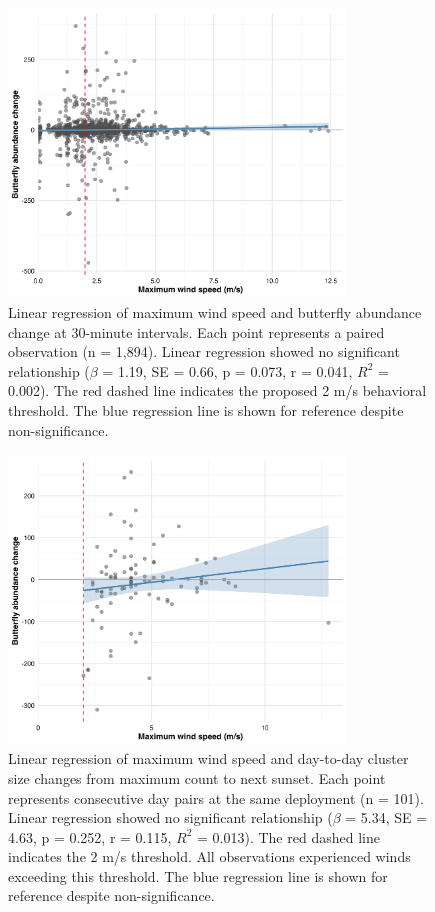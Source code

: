 \begin{figure}[htbp]
    \centering
    \includegraphics[width=0.8\textwidth]{supplemental/results/30_min/figures/wind_vs_change_bivariate_untransformed.png}
    \caption{Linear regression of maximum wind speed and butterfly abundance change at 30-minute intervals. Each point represents a paired observation (n = 1,894). Linear regression showed no significant relationship ($\beta$ = 1.19, SE = 0.66, p = 0.073, r = 0.041, $R^2$ = 0.002). The red dashed line indicates the proposed 2 m/s behavioral threshold. The blue regression line is shown for reference despite non-significance.}
    \label{fig:wind_bivariate_30min}
\end{figure}

\begin{figure}[htbp]
    \centering
    \includegraphics[width=0.8\textwidth]{supplemental/results/sunset/figures/wind_vs_change_bivariate_untransformed.png}
    \caption{Linear regression of maximum wind speed and day-to-day cluster size changes from maximum count to next sunset. Each point represents consecutive day pairs at the same deployment (n = 101). Linear regression showed no significant relationship ($\beta$ = 5.34, SE = 4.63, p = 0.252, r = 0.115, $R^2$ = 0.013). The red dashed line indicates the 2 m/s threshold. All observations experienced winds exceeding this threshold. The blue regression line is shown for reference despite non-significance.}
    \label{fig:wind_bivariate_sunset}
\end{figure}

